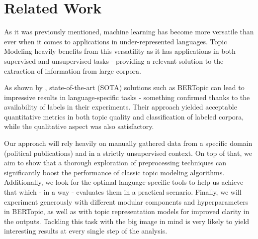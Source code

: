 \section{Related Work}
\label{sec:related_work}
As it was previously mentioned, machine learning has become more versatile than ever when it comes to applications in under-represented languages. Topic Modeling heavily benefits from this versatility as it has applications in both supervised and unsupervised tasks - providing a relevant solution to the extraction of information from large corpora. 

As shown by \cite{Panagiotis;22}, state-of-the-art (SOTA) solutions such as BERTopic can lead to impressive results in language-specific tasks - something confirmed thanks to the availability of labels in their experiments. Their approach yielded acceptable quantitative metrics in both topic quality and classification of labeled corpora, while the qualitative aspect was also satisfactory. 

Our approach will rely heavily on manually gathered data from a specific domain (political publications) and in a strictly unsupervised context. On top of that, we aim to show that a thorough exploration of preprocessing techniques can significantly boost the performance of classic topic modeling algorithms. Additionally, we look for the optimal language-specific tools to help us achieve that which - in a way - evaluates them in a practical scenario. Finally, we will experiment generously with different modular components and hyperparameters in BERTopic, as well as with topic representation models for improved clarity in the outputs. Tackling this task with the big image in mind is very likely to yield interesting results at every single step of the analysis.